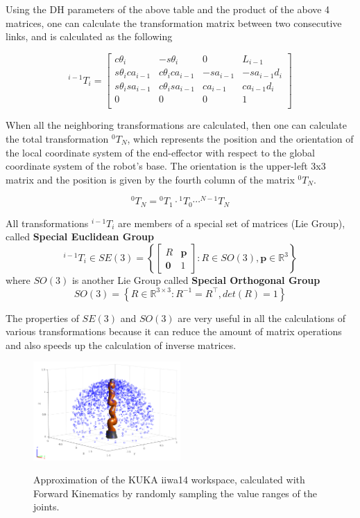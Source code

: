 Using the DH parameters of the above table and the product of the above 4 matrices, one can calculate the transformation matrix between two consecutive links, and is calculated as the following

\begin{equation}
^{i-1}T_i = 
\begin{bmatrix}
c\theta_i & -s\theta_i & 0 & L_{i-1} \\
s\theta_ica_{i-1} & c\theta_ica_{i-1} & -sa_{i-1} & -sa_{i-1}d_i \\
s\theta_isa_{i-1} & c\theta_isa_{i-1} & ca_{i-1} & ca_{i-1}d_i \\
0 & 0 & 0 & 1\\
\end{bmatrix}
\end{equation}

When all the neighboring transformations are calculated, then one can calculate the total transformation $^{0}T_N$, which represents the position and the 
orientation of the local coordinate system of the end-effector with respect to the global coordinate system of the robot's base. The orientation is the 
upper-left 3x3 matrix and the position is given by the fourth column of the matrix $^{0}T_N$.

\begin{equation}
^{0}T_N = {}^{0}T_1 \cdot {}^{1}T_0 \cdots {}^{N-1}T_N
\end{equation}

All transformations $^{i-1}T_i$ are members of a special set of matrices (Lie Group), called \textbf{Special Euclidean Group}
\[
^{i-1}T_i \in SE(3) = \left\lbrace \begin{bmatrix}
R & \mathbf{p}\\
\mathbf{0} & 1
\end{bmatrix} : R \in SO(3), \mathbf{p} \in \mathbb{R}^{3} \right\rbrace
\]
where $SO(3)$ is another Lie Group called \textbf{Special Orthogonal Group}
\[
SO(3) = \left\lbrace R \in \mathbb{R}^{3 \times 3}: R^{-1}=R^\top, det(R)=1 \right\rbrace
\]

The properties of $SE(3)$ and $SO(3)$ are very useful in all the calculations of various transformations because it can reduce the amount of matrix operations and also speeds up the calculation 
of inverse matrices.

\begin{center}
\begin{figure}[!htb]
\centering
\includegraphics[width=0.5\textwidth]{images/workspace_sampling_1e3.png}\\
\caption{Approximation of the KUKA iiwa14 workspace, calculated with Forward Kinematics by randomly sampling the value ranges of the joints.}
\end{figure}
\end{center}

